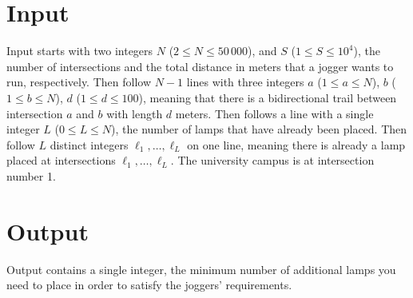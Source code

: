 \section*{Input}
Input starts with two integers $N$ ($2 \leq N \leq 50\,000$), and $S$ ($1
\leq S \leq 10^4$), the number of intersections and the
total distance in meters that a jogger wants to run, respectively. Then follow $N-1$ lines with three
integers $a$ ($1 \leq a \leq N$), $b$ ($1 \leq b \leq N$), $d$ ($1 \leq d \leq 100$), meaning
that there is a bidirectional trail between intersection $a$ and $b$ with length $d$ meters. 
Then follows a line with a single integer $L$ ($0 \leq L \leq N$), the number of lamps that have already been placed.
Then follow $L$ distinct integers $\ell_1, \dots, \ell_L$ on one line, meaning there is already a lamp placed at
intersections $\ell_1, \dots, \ell_L$. The university campus is at intersection number 1.

\section*{Output}
Output contains a single integer, the minimum number of additional lamps you need to place in order
to satisfy the joggers’ requirements.

